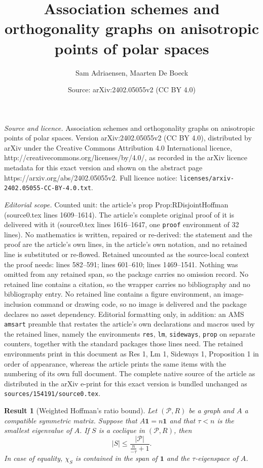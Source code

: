 \documentclass[10pt,a4paper]{amsart}
\title{Association schemes and orthogonality graphs on anisotropic points of polar spaces}
\author{Sam Adriaensen, Maarten De Boeck}
\date{Source: arXiv:2402.05055v2 (CC BY 4.0)}
\newtheorem{res}{Result}
\newcommand{\one}{\mathbf 1}
\newcommand{\pp}{\mathcal P}
\begin{document}
\maketitle

\noindent\emph{Source and licence.} Association schemes and orthogonality graphs on anisotropic points of polar spaces. Version arXiv:2402.05055v2 (CC BY 4.0), distributed by arXiv under the Creative Commons Attribution 4.0 International licence, http://creativecommons.org/licenses/by/4.0/, as recorded in the arXiv licence metadata for this exact version and shown on the abstract page https://arxiv.org/abs/2402.05055v2. Full licence notice: \texttt{licenses/arxiv-2402.05055-CC-BY-4.0.txt}.\par\smallskip

\noindent\textit{Editorial scope.} Counted unit: the article's prop Prop:RDisjointHoffman (source0.tex lines 1609--1614). The article's complete original proof of it is delivered with it (source0.tex lines 1616--1647, one \texttt{proof} environment of 32 lines). No mathematics is written, repaired or re-derived: the statement and the proof are the article's own lines, in the article's own notation, and no retained line is substituted or re-flowed.  Retained uncounted as the source-local context the proof needs: lines 582--591; lines 601--610; lines 1469--1541.  Nothing was omitted from any retained span, so the package carries no omission record.  No retained line contains a citation, so the wrapper carries no bibliography and no bibliography entry.  No retained line contains a figure environment, an image-inclusion command or drawing code, so no image is delivered and the package declares no asset dependency.  Editorial formatting only, in addition: an AMS \texttt{amsart} preamble that restates the article's own declarations and macros used by the retained lines, namely the environments \texttt{res}, \texttt{lm}, \texttt{sideways}, \texttt{prop} on separate counters, together with the standard packages those lines need.  The retained environments print in this document as Res 1, Lm 1, Sideways 1, Proposition 1 in order of appearance, whereas the article prints the same items with the numbering of its own full document.  The complete native source of the article as distributed in the arXiv e-print for this exact version is bundled unchanged as \texttt{sources/154191/source0.tex}.
\begin{res}[Weighted Hoffman's ratio bound]
 \label{Res:Hoffman}
 Let $(\pp,R)$ be a graph and $A$ a compatible symmetric matrix.
 Suppose that $A \one = n \one$ and that $\tau < n$ is the smallest eigenvalue of $A$.
 If $S$ is a coclique in $(\pp,R)$, then
 \[
  |S| \leq \frac{|\pp|}{\frac{n}{-\tau}+1}.
 \]
 In case of equality, $\chi_S$ is contained in the span of $\one$ and the $\tau$-eigenspace of $A$.
\end{res}
\end{document}
